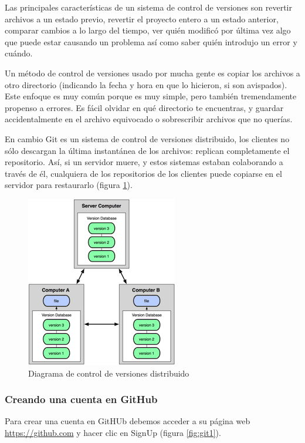 \bigskip
Las principales características de un sistema de control de versiones son revertir archivos a un estado previo, revertir el proyecto entero a un estado anterior, comparar cambios a lo largo del tiempo, ver quién modificó por última vez algo que puede estar causando un problema así como saber quién introdujo un error y cuándo.

\bigskip
Un método de control de versiones usado por mucha gente es copiar los archivos a otro directorio (indicando la fecha y hora en que lo hicieron, si son avispados). Este enfoque es muy común porque es muy simple, pero también tremendamente propenso a errores. Es fácil olvidar en qué directorio te encuentras, y guardar accidentalmente en el archivo equivocado o sobrescribir archivos que no querías.

\bigskip
En cambio Git es un sistema de control de versiones distribuido, los clientes no sólo descargan la última instantánea de los archivos: replican completamente el repositorio. Así, si un servidor muere, y estos sistemas estaban colaborando a través de él, cualquiera de los repositorios de los clientes puede copiarse en el servidor para restaurarlo (figura \ref{fig:dvcs}).

\begin{figure}[H]
\centering
\includegraphics{../images/dvcs}
\caption{Diagrama de control de versiones distribuido}
\label{fig:dvcs}
\end{figure}

\subsubsection{Creando una cuenta en GitHub}

Para crear una cuenta en GitHUb debemos acceder a su página web \url{https://github.com} y hacer clic en SignUp (figura \ref{fig:git1}).

